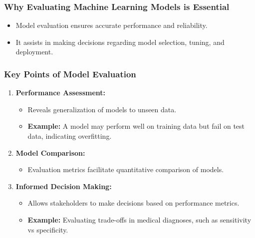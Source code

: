 \documentclass[aspectratio=169]{beamer}
\begin{document}
\begin{frame}[fragile]
  \frametitle{Why Evaluating Machine Learning Models is Essential}
  \begin{itemize}
    \item Model evaluation ensures accurate performance and reliability.
    \item It assists in making decisions regarding model selection, tuning, and deployment.
  \end{itemize}
\end{frame}

\begin{frame}[fragile]
  \frametitle{Key Points of Model Evaluation}
  \begin{enumerate}
    \item \textbf{Performance Assessment:}
      \begin{itemize}
        \item Reveals generalization of models to unseen data.
        \item \textbf{Example:} A model may perform well on training data but fail on test data, indicating overfitting.
      \end{itemize}

    \item \textbf{Model Comparison:}
      \begin{itemize}
        \item Evaluation metrics facilitate quantitative comparison of models.
      \end{itemize}
      
    \item \textbf{Informed Decision Making:}
      \begin{itemize}
        \item Allows stakeholders to make decisions based on performance metrics.
        \item \textbf{Example:} Evaluating trade-offs in medical diagnoses, such as sensitivity vs specificity.
      \end{itemize}
  \end{enumerate}
\end{frame}
\end{document}
